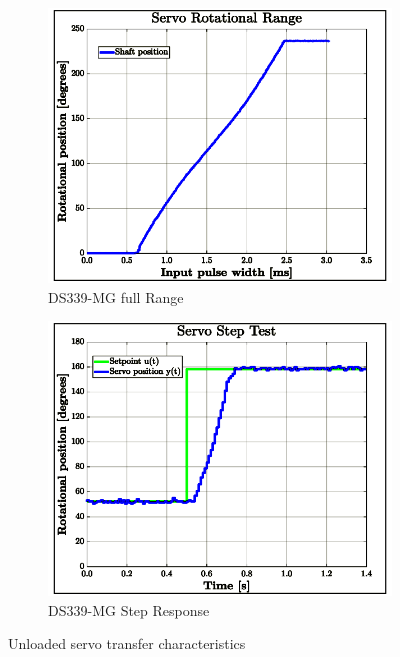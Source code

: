 \begin{figure}[htbp]
\centering
\begin{subfigure}{0.49\textwidth}
\centering
\includegraphics[width=\textwidth]{graphs/servo-range}
\caption{DS339-MG full Range}
\label{fig:servo-range}
\end{subfigure}
\begin{subfigure}{0.49\textwidth}
\centering
\includegraphics[width=\textwidth]{graphs/servo-step}
\caption{DS339-MG Step Response}
\label{fig:servo-step}
\end{subfigure}
\vspace{-8pt}
\caption{Unloaded servo transfer characteristics}
\label{fig:servo-no-load}
\vspace{-16pt}
\end{figure}
